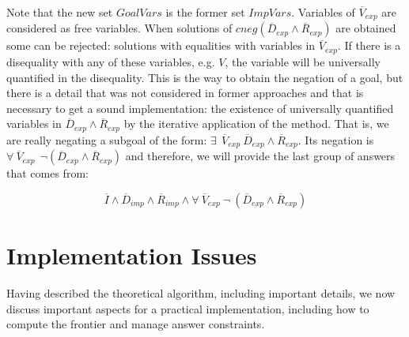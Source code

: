 \documentclass{llncs}
\begin{document}
\begin{itemize}
           Note that the new set $GoalVars$ is the former set
           $ImpVars$. Variables of $\overline{V}_{exp}$ are considered
           as free variables. When solutions of
           $cneg(\overline{D}_{exp} \wedge \overline{R}_{exp})$ are
           obtained some can be rejected: solutions with equalities
           with variables in $\overline{V}_{exp}$. If there is a
           disequality with any of these variables, e.g. $V$, the
           variable will be universally quantified in the disequality.
           This is the way to obtain the negation of a goal, but there
           is a detail that was not considered in former approaches
           and that is necessary to get a sound implementation: the
           existence of universally quantified variables in
           $\overline{D}_{exp} \wedge \overline{R}_{exp}$ by the
           iterative application of the method. That is, we are really
           negating a subgoal of the form: $ \exists~~
           \overline{V}_{exp}~ \overline{D}_{exp} \wedge
           \overline{R}_{exp}$. Its negation is $\forall~
           \overline{V}_{exp}~~ \neg(\overline{D}_{exp} \wedge
           \overline{R}_{exp})$ and therefore, we will provide the
           last group of answers that comes from:

           \[\overline{I} \wedge \overline{D}_{imp}
           \wedge \overline{R}_{imp} \wedge \forall~
           \overline{V}_{exp}~ \neg~(\overline{D}_{exp} \wedge
           \overline{R}_{exp})\]

         \end{itemize}


    


\section{Implementation Issues}
\label{implementation}

Having described the theoretical algorithm, including important
details, we now discuss important aspects for a practical
implementation, including how to compute the frontier and manage
answer constraints.


\vspace{-0.1in}
\end{document}
